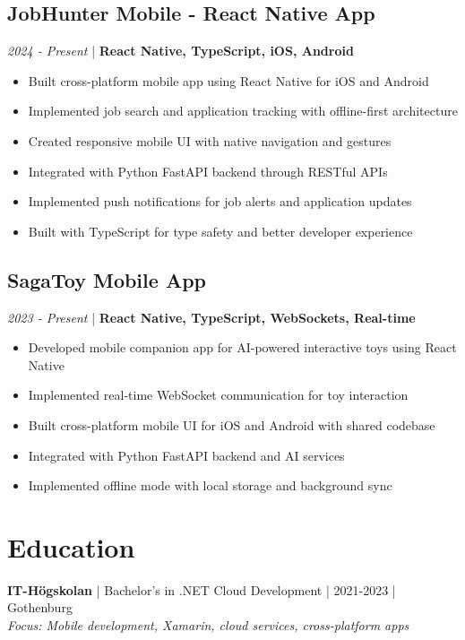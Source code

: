 \documentclass[11pt,a4paper]{article}
\begin{document}
\subsection*{JobHunter Mobile - React Native App}
\textit{2024 - Present} | \textbf{React Native, TypeScript, iOS, Android}
\begin{itemize}[leftmargin=*, itemsep=1pt]
\item Built cross-platform mobile app using React Native for iOS and Android
\item Implemented job search and application tracking with offline-first architecture
\item Created responsive mobile UI with native navigation and gestures
\item Integrated with Python FastAPI backend through RESTful APIs
\item Implemented push notifications for job alerts and application updates
\item Built with TypeScript for type safety and better developer experience
\end{itemize}

\subsection*{SagaToy Mobile App}
\textit{2023 - Present} | \textbf{React Native, TypeScript, WebSockets, Real-time}
\begin{itemize}[leftmargin=*, itemsep=1pt]
\item Developed mobile companion app for AI-powered interactive toys using React Native
\item Implemented real-time WebSocket communication for toy interaction
\item Built cross-platform mobile UI for iOS and Android with shared codebase
\item Integrated with Python FastAPI backend and AI services
\item Implemented offline mode with local storage and background sync
\end{itemize}

\section*{Education}

\textbf{IT-Högskolan} | Bachelor's in .NET Cloud Development | 2021-2023 | Gothenburg\\
\textit{Focus: Mobile development, Xamarin, cloud services, cross-platform apps}
\end{document}
